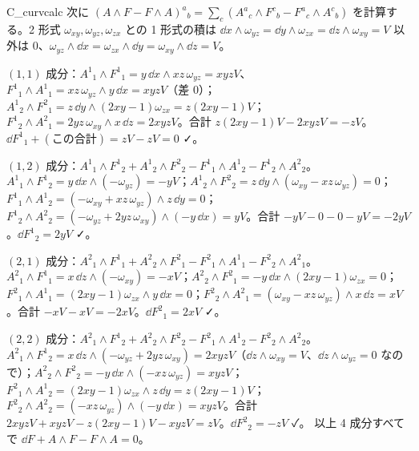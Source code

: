 \begin{soll}{C_curvcalc}
次に $(A\wedge F-F\wedge A)^a{}_b=\sum_c(A^a{}_c\wedge F^c{}_b-F^a{}_c\wedge A^c{}_b)$ を計算する。2 形式 $\omega_{xy},\omega_{yz},\omega_{zx}$ との 1 形式の積は $\dd x\wedge\omega_{yz}=\dd y\wedge\omega_{zx}=\dd z\wedge\omega_{xy}=V$ 以外は $0$、$\omega_{yz}\wedge\dd x=\omega_{zx}\wedge\dd y=\omega_{xy}\wedge\dd z=V$。
\par\noindent$(1,1)$ 成分：$A^1{}_1\wedge F^1{}_1=y\,\dd x\wedge xz\,\omega_{yz}=xyzV$、$F^1{}_1\wedge A^1{}_1=xz\,\omega_{yz}\wedge y\,\dd x=xyzV$（差 $0$）；$A^1{}_2\wedge F^2{}_1=z\,\dd y\wedge(2xy-1)\omega_{zx}=z(2xy-1)V$；$F^1{}_2\wedge A^2{}_1=2yz\,\omega_{xy}\wedge x\,\dd z=2xyzV$。合計 $z(2xy-1)V-2xyzV=-zV$。$\dd F^1{}_1+(\text{この合計})=zV-zV=0$ ✓。
\par\noindent$(1,2)$ 成分：$A^1{}_1\wedge F^1{}_2+A^1{}_2\wedge F^2{}_2-F^1{}_1\wedge A^1{}_2-F^1{}_2\wedge A^2{}_2$。$A^1{}_1\wedge F^1{}_2=y\,\dd x\wedge(-\omega_{yz})=-yV$；$A^1{}_2\wedge F^2{}_2=z\,\dd y\wedge(\omega_{xy}-xz\,\omega_{yz})=0$；$F^1{}_1\wedge A^1{}_2=(-\omega_{xy}+xz\,\omega_{yz})\wedge z\,\dd y=0$；$F^1{}_2\wedge A^2{}_2=(-\omega_{yz}+2yz\,\omega_{xy})\wedge(-y\,\dd x)=yV$。合計 $-yV-0-0-yV=-2yV$。$\dd F^1{}_2=2yV$ ✓。
\par\noindent$(2,1)$ 成分：$A^2{}_1\wedge F^1{}_1+A^2{}_2\wedge F^2{}_1-F^2{}_1\wedge A^1{}_1-F^2{}_2\wedge A^2{}_1$。$A^2{}_1\wedge F^1{}_1=x\,\dd z\wedge(-\omega_{xy})=-xV$；$A^2{}_2\wedge F^2{}_1=-y\,\dd x\wedge(2xy-1)\omega_{zx}=0$；$F^2{}_1\wedge A^1{}_1=(2xy-1)\omega_{zx}\wedge y\,\dd x=0$；$F^2{}_2\wedge A^2{}_1=(\omega_{xy}-xz\,\omega_{yz})\wedge x\,\dd z=xV$。合計 $-xV-xV=-2xV$。$\dd F^2{}_1=2xV$ ✓。
\par\noindent$(2,2)$ 成分：$A^2{}_1\wedge F^1{}_2+A^2{}_2\wedge F^2{}_2-F^2{}_1\wedge A^1{}_2-F^2{}_2\wedge A^2{}_2$。$A^2{}_1\wedge F^1{}_2=x\,\dd z\wedge(-\omega_{yz}+2yz\,\omega_{xy})=2xyzV$（$\dd z\wedge\omega_{xy}=V$、$\dd z\wedge\omega_{yz}=0$ なので）；$A^2{}_2\wedge F^2{}_2=-y\,\dd x\wedge(-xz\,\omega_{yz})=xyzV$；$F^2{}_1\wedge A^1{}_2=(2xy-1)\omega_{zx}\wedge z\,\dd y=z(2xy-1)V$；$F^2{}_2\wedge A^2{}_2=(-xz\,\omega_{yz})\wedge(-y\,\dd x)=xyzV$。合計 $2xyzV+xyzV-z(2xy-1)V-xyzV=zV$。$\dd F^2{}_2=-zV$ ✓。
以上 4 成分すべてで $\dd F+A\wedge F-F\wedge A=0$。
\end{soll}


